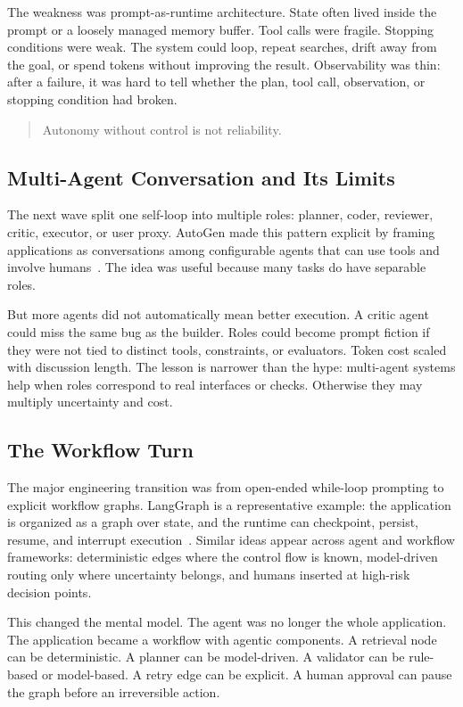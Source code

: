 The weakness was prompt-as-runtime architecture. State often lived inside the prompt or a loosely managed memory buffer. Tool calls were fragile. Stopping conditions were weak. The system could loop, repeat searches, drift away from the goal, or spend tokens without improving the result. Observability was thin: after a failure, it was hard to tell whether the plan, tool call, observation, or stopping condition had broken.

\begin{quote}
Autonomy without control is not reliability.
\end{quote}

\subsection{Multi-Agent Conversation and Its Limits}

The next wave split one self-loop into multiple roles: planner, coder, reviewer, critic, executor, or user proxy. AutoGen made this pattern explicit by framing applications as conversations among configurable agents that can use tools and involve humans~\cite{wu2023autogen}. The idea was useful because many tasks do have separable roles.

But more agents did not automatically mean better execution. A critic agent could miss the same bug as the builder. Roles could become prompt fiction if they were not tied to distinct tools, constraints, or evaluators. Token cost scaled with discussion length. The lesson is narrower than the hype: multi-agent systems help when roles correspond to real interfaces or checks. Otherwise they may multiply uncertainty and cost.

\subsection{The Workflow Turn}

The major engineering transition was from open-ended while-loop prompting to explicit workflow graphs. LangGraph is a representative example: the application is organized as a graph over state, and the runtime can checkpoint, persist, resume, and interrupt execution~\cite{langgraph2026persistence}. Similar ideas appear across agent and workflow frameworks: deterministic edges where the control flow is known, model-driven routing only where uncertainty belongs, and humans inserted at high-risk decision points.

This changed the mental model. The agent was no longer the whole application. The application became a workflow with agentic components. A retrieval node can be deterministic. A planner can be model-driven. A validator can be rule-based or model-based. A retry edge can be explicit. A human approval can pause the graph before an irreversible action.

